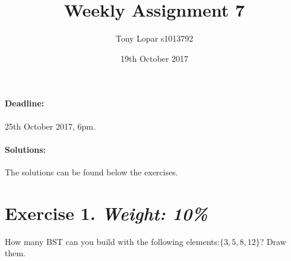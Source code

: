 \documentclass{article}
\begin{document}
\title{Weekly Assignment 7}
\author{Tony Lopar s1013792}
\date{19th October 2017}
\maketitle

\paragraph{Deadline:} 25th October 2017, 6pm.
\paragraph{Solutions:} The solutions can be found below the exercises.

\section*{Exercise 1. \textit{Weight: 10\%}}
How many BST can you build with the following elements:$\{3, 5, 8, 12\}$? Draw them.
\end{document}
